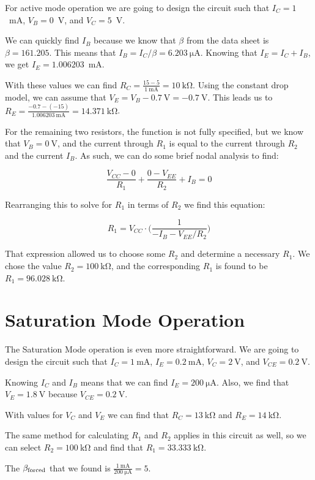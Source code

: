 \documentclass{../../ece-report}
\begin{document}
For active mode operation we are going to design the
circuit such that $I_C = 1$~mA, $V_B = 0$~V, and $V_C
= 5$~V.

We can quickly find $I_B$ because we know that
$\beta$ from the data sheet is $\beta=161.205$.
This means that $I_B = I_C/\beta = 6.203~\si{\uA}$.
Knowing that $I_E = I_C + I_B$, we get $I_E = 1.006203$~mA.

With these values we can find $R_C = \frac{15 - 5}{1~\si{\mA}}
= 10~\si{\kohm}$. Using the constant drop model, we
can assume that $V_E = V_B - 0.7~\si{\V} = -0.7~\si{\V}$.
This leads us to $R_E = \frac{-0.7 - (-15)}{1.006203~\si{\mA}}
= 14.371~\si{\kohm}$.

For the remaining two resistors, the function is not
fully specified, but we know that $V_B = 0~\si{\V}$,
and the current through $R_1$ is equal to the current
through $R_2$ and the current $I_B$. As such, we can
do some brief nodal analysis to find:

\[
  \frac{V_{CC} - 0}{R_1} + \frac{0 - V_{EE}}{R_2} + I_B = 0
\]

Rearranging this to solve for $R_1$ in terms of $R_2$ we find this equation:

\[
  R_1 = V_{CC} \cdot \Big( \frac{1}{-I_B - V_{EE} / R_2} \Big)
\]

That expression allowed us to choose some $R_2$ and determine
a necessary $R_1$. We chose the value $R_2 = 100~\si{\kohm}$,
and the corresponding $R_1$ is found to be $R_1 = 96.028~\si{\kohm}$.

\section*{Saturation Mode Operation}

The Saturation Mode operation is even more straightforward.
We are going to design the circuit such that $I_C =
1~\si{\mA}$, $I_E = 0.2~\si{\mA}$, $V_C = 2~\si{\V}$,
and $V_{CE}=0.2~\si{\V}$. 

Knowing $I_C$ and $I_B$ means that we can find $I_E
= 200~\si{\uA}$. Also, we find that $V_E = 1.8~\si{\V}$ 
because $V_{CE} = 0.2~\si{\V}$.

With values for $V_C$ and $V_E$ we can find that $R_C
= 13~\si{\kohm}$ and $R_E = 14~\si{\kohm}$. 

The same method for calculating $R_1$ and $R_2$ applies
in this circuit as well, so we can select $R_2 = 100~\si{\kohm}$
and find that $R_1 = 33.333~\si{\kohm}$.

The $\beta_\textnormal{forced}$ that we found is $\frac{1~\si\mA}{200~\si{\uA}} = 5$.
\end{document}
